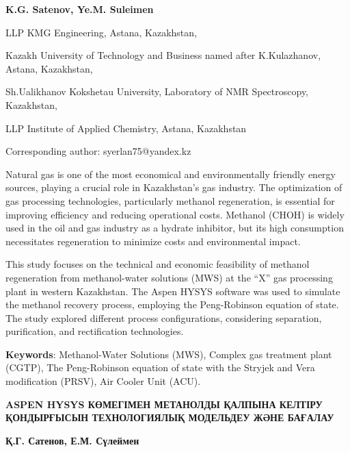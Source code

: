 
\begin{header}

{\bfseries
{}K.G. Satenov,
Ye.M. Suleimen\envelope 
}
\end{header}

\begin{affil}
LLP KMG Engineering, Astana, Kazakhstan,

Kazakh University of Technology and Business named after K.Kulazhanov, Astana, Kazakhstan,

Sh.Ualikhanov Kokshetau University, Laboratory of NMR Spectroscopy, Kazakhstan,

LLP Institute of Applied Chemistry, Astana, Kazakhstan

\envelope Corresponding author: syerlan75@yandex.kz
\end{affil}

Natural gas is one of the most economical and environmentally friendly
energy sources, playing a crucial role in Kazakhstan's gas industry. The
optimization of gas processing technologies, particularly methanol
regeneration, is essential for improving efficiency and reducing
operational costs. Methanol (CHOH) is widely used in
the oil and gas industry as a hydrate inhibitor, but its high
consumption necessitates regeneration to minimize costs and
environmental impact.

This study focuses on the technical and economic feasibility of methanol
regeneration from methanol-water solutions (MWS) at the ``X'' gas
processing plant in western Kazakhstan. The Aspen HYSYS software was
used to simulate the methanol recovery process, employing the
Peng-Robinson equation of state. The study explored different process
configurations, considering separation, purification, and rectification
technologies.

{\bfseries Keywords}: Methanol-Water Solutions (MWS), Complex gas treatment
plant (CGTP), The Peng-Robin\-son equation of state with the Stryjek and
Vera modification (PRSV), Air Cooler Unit (ACU).

\begin{header}
{\bfseries ASPEN HYSYS КӨМЕГІМЕН МЕТАНОЛДЫ ҚАЛПЫНА КЕЛТІРУ ҚОНДЫРҒЫСЫН
ТЕХНОЛОГИЯЛЫҚ МОДЕЛЬДЕУ ЖӘНЕ БАҒАЛАУ}

{\bfseries
{}Қ.Г. Сатенов,
Е.М. Сүлеймен\envelope
}
\end{header}

